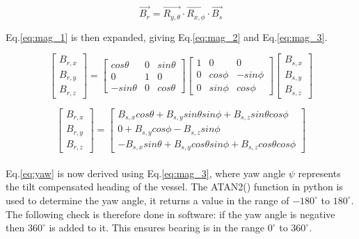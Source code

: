 \begin{equation}
    \label{eq:mag_1}
    \vec{B_{r}} = \vec{R_{y,\theta}} \cdot \vec{R_{x,\phi}} \cdot \vec{B_{s}}
\end{equation}

Eq.\ref{eq:mag_1} is then expanded, giving Eq.\ref{eq:mag_2} and Eq.\ref{eq:mag_3}.

\begin{equation}
    \label{eq:mag_2}
    \begin{bmatrix} B_{r,x} \\ B_{r,y} \\ B_{r,z} \end{bmatrix} = \begin{bmatrix} cos\theta & 0 & sin\theta \\ 0 & 1 & 0 \\ -sin\theta & 0 & cos\theta \end{bmatrix} \begin{bmatrix} 1 & 0 & 0 \\ 0 & cos\phi & -sin\phi \\ 0 & sin\phi & cos\phi \end{bmatrix} \begin{bmatrix} B_{s,x} \\ B_{s,y} \\ B_{s,z} \end{bmatrix}
\end{equation}

\begin{equation}
    \label{eq:mag_3}
    \begin{bmatrix} B_{r,x} \\ B_{r,y} \\ B_{r,z} \end{bmatrix} = \begin{bmatrix} B_{s,x} cos\theta + B_{s,y} sin\theta sin\phi + B_{s,z} sin\theta cos\phi \\ 0 + B_{s,y} cos\phi - B_{s,z} sin\phi \\ -B_{s,x} sin\theta +  B_{s,y} cos\theta sin\phi + B_{s,z} cos\theta cos\phi \end{bmatrix} 
\end{equation}
\\

Eq.\ref{eq:yaw} is now derived using Eq.\ref{eq:mag_3}, where yaw angle $\psi$ represents the tilt compensated heading of the vessel. The ATAN2() function in python is used to determine 
the yaw angle, it returns a value in the range of $-180^{\circ}$ to $180^{\circ}$. The following check is therefore done in software: if the yaw angle is negative then $360^{\circ}$ is added
to it. This ensures bearing is in the range $0^{\circ}$ to $360^{\circ}$.

